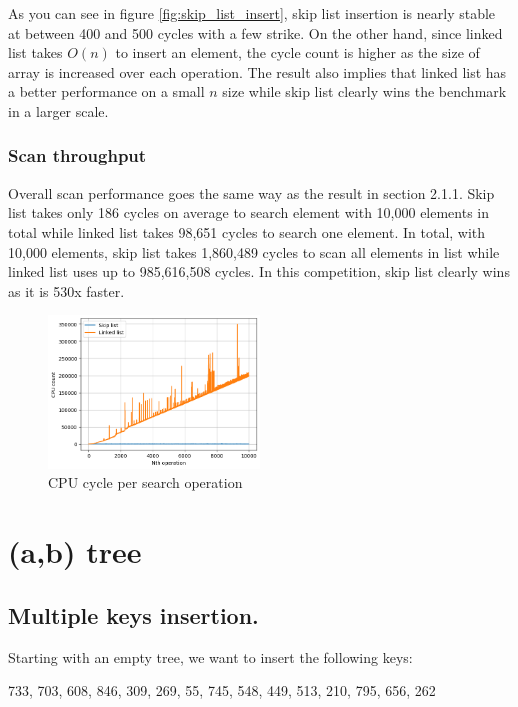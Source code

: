 \documentclass[a4paper, 12pt]{report}
\begin{document}
As you can see in figure \ref{fig:skip_list_insert}, skip list insertion is nearly stable at between 400 and 500 cycles with a few strike.
On the other hand, since linked list takes $O(n)$ to insert an element, the cycle count is higher as the size of array is increased over each operation.
The result also implies that linked list has a better performance on a small $n$ size while skip list clearly wins the benchmark in a larger scale.

\subsection{Scan throughput}
Overall scan performance goes the same way as the result in section 2.1.1. Skip list takes only 186 cycles on average to search element with 10,000 elements in total
while linked list takes 98,651 cycles to search one element. In total, with 10,000 elements, skip list takes 1,860,489 cycles to scan all elements in list while linked list
uses up to 985,616,508 cycles. In this competition, skip list clearly wins as it is 530x faster.

\begin{figure}[h]
        \centering
        \includegraphics[width=0.5\textwidth,scale=0.5]{skip_list_scan.png}
        \caption{\label{fig:skip_list_scan} CPU cycle per search operation}
\end{figure}


\chapter{(a,b) tree}

\section{Multiple keys insertion.}

Starting with an empty tree, we want to insert the following keys:
\begin{center}
        733, 703, 608, 846, 309, 269, 55, 745, 548, 449, 513, 210, 795, 656, 262
\end{center}
\end{document}
